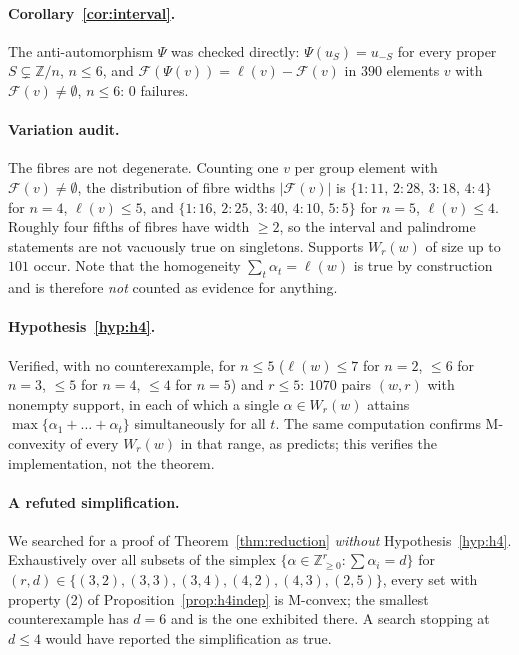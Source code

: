 \documentclass[11pt]{article}
\theoremstyle{definition}
\newcommand{\Z}{\mathbb{Z}}
\begin{document}
\paragraph{Corollary~\ref{cor:interval}.}
The anti-automorphism $\Psi$ was checked directly: $\Psi(u_S)=u_{-S}$ for every proper
$S\subsetneq\Z/n$, $n\le6$, and $\mathcal F(\Psi(v))=\ell(v)-\mathcal F(v)$ in $390$ elements
$v$ with $\mathcal F(v)\ne\emptyset$, $n\le6$: $0$ failures.

\paragraph{Variation audit.}
The fibres are not degenerate. Counting one $v$ per group element with
$\mathcal F(v)\ne\emptyset$, the distribution of fibre widths $|\mathcal F(v)|$ is
$\{1:11,\,2:28,\,3:18,\,4:4\}$ for $n=4$, $\ell(v)\le5$, and
$\{1:16,\,2:25,\,3:40,\,4:10,\,5:5\}$ for $n=5$, $\ell(v)\le4$. Roughly four fifths of
fibres have width $\ge2$, so the interval and palindrome statements are not vacuously true on
singletons. Supports $W_r(w)$ of size up to $101$ occur.
Note that the homogeneity $\sum_t\alpha_t=\ell(w)$ is true by construction and is therefore
\emph{not} counted as evidence for anything.

\paragraph{Hypothesis~\ref{hyp:h4}.}
Verified, with no counterexample, for $n\le5$ ($\ell(w)\le7$ for $n=2$, $\le6$ for $n=3$,
$\le5$ for $n=4$, $\le4$ for $n=5$) and $r\le5$: $1070$ pairs $(w,r)$ with
nonempty support, in each of which a single $\alpha\in W_r(w)$ attains
$\max\{\alpha_1+\dots+\alpha_t\}$ simultaneously for all $t$. The same computation confirms
M-convexity of every $W_r(w)$ in that range, as \cite[Thm.~4.7]{WZZ} predicts; this verifies the
implementation, not the theorem.

\paragraph{A refuted simplification.}
We searched for a proof of Theorem~\ref{thm:reduction} \emph{without}
Hypothesis~\ref{hyp:h4}. Exhaustively over all subsets of the simplex
$\{\alpha\in\Z^r_{\ge0}:\sum\alpha_i=d\}$ for $(r,d)\in\{(3,2),(3,3),(3,4),(4,2),(4,3),(2,5)\}$,
every set with property (2) of Proposition~\ref{prop:h4indep} is M-convex; the smallest
counterexample has $d=6$ and is the one exhibited there. A search stopping at $d\le4$ would have
reported the simplification as true.
\end{document}
